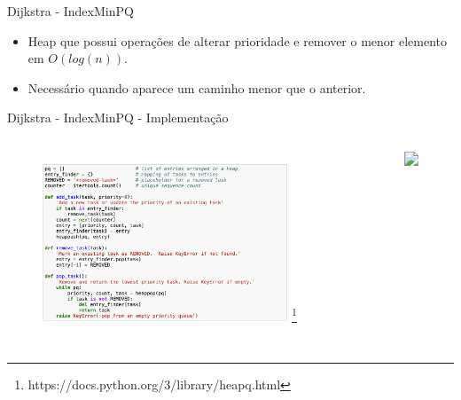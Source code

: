 \documentclass[aspectratio=169,usenames,dvipsnames]{beamer}
\begin{document}
\begin{frame}{Dijkstra - IndexMinPQ}
    \vfill
    \begin{itemize}
        \item Heap que possui operações de alterar prioridade e remover o menor elemento em $O(log(n))$.
        \item Necessário quando aparece um caminho menor que o anterior. 
    \end{itemize}
    \vfill
\end{frame}



\begin{frame}{Dijkstra - IndexMinPQ - Implementação}
    \vfill
    \begin{columns}
        \begin{figure}[ht]
            \centering
            \includegraphics[width=0.9\textwidth]{figs/heapq_python.png}
            \footnote{https://docs.python.org/3/library/heapq.html}
        \end{figure}
        \begin{figure}[ht]
            \centering
            \includegraphics<2>[width=0.9\textwidth]{figs/indexminpq.png}
        \end{figure}
    \end{columns}
    \vfill
\end{frame}
\end{document}
